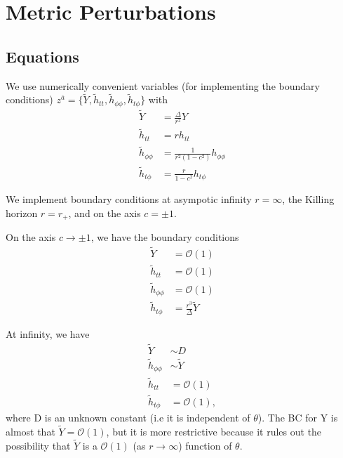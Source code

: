 \documentclass[aps,prd,amsmath,showpacs,amssymb,superscriptaddress,nofootinbib,longbibliography,eqsecnum,preprintnumbers]{revtex4-1}
\begin{document}

\section{Metric Perturbations}
\subsection{Equations}
We use numerically convenient variables (for implementing the boundary conditions) $z^{\bar a}=\{\tilde Y, \tilde h_{tt}, \tilde h_{\phi\phi}, \tilde h_{t\phi} \}$ with
\begin{align}
\tilde Y&=\frac{\Delta}{r^2}Y \nonumber \\
\tilde h_{tt}&=r h_{tt} \nonumber \\
\tilde h_{\phi\phi}&=\frac{1}{r^2(1-c^2)}h_{\phi\phi}
\nonumber \\
\tilde h_{t \phi}&=\frac{r}{1-c^2}h_{t\phi}
\end{align}

We implement boundary conditions at asympotic infinity $r=\infty$, the Killing horizon $r=r_+$, and on the axis $c=\pm 1$. 

On the axis $c\to \pm 1$, we have the boundary conditions
\begin{align}
\tilde Y&=\mathcal{O}(1) \nonumber \\
\tilde h_{tt}&=\mathcal{O}(1) \nonumber \\
\tilde h_{\phi\phi} &=\mathcal{O}(1) \nonumber \\
\tilde h_{t\phi}&=\frac{r^3}{\Delta}\tilde Y
\end{align}

At infinity, we have 
\begin{align}
\tilde Y &\sim D \nonumber \\
\tilde h_{\phi\phi}&\sim \tilde Y \nonumber \\
\tilde h_{tt} &=\mathcal{O}(1) \nonumber \\ 
\tilde h_{t\phi}&=\mathcal{O}(1),
\end{align}
where D is an unknown constant (i.e it is independent of $\theta$). The BC for Y is almost that $\tilde Y =\mathcal{O}(1)$, but it is more restrictive because it rules out the possibility that $\tilde Y$ is a $\mathcal{O}(1)$ (as $r \to \infty$) function of $\theta$. 
\end{document}
